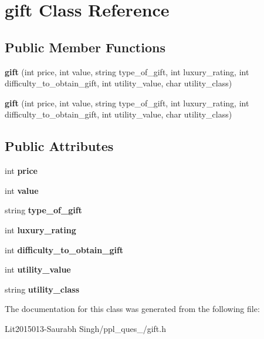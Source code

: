 \hypertarget{classgift}{}\section{gift Class Reference}
\label{classgift}
\subsection*{Public Member Functions}
\begin{DoxyCompactItemize}
\item 
\mbox{\label{classgift_a63b728ae46adca610d41cad4f66b8b24}} 
{\bfseries gift} (int price, int value, string type\+\_\+of\+\_\+gift, int luxury\+\_\+rating, int difficulty\+\_\+to\+\_\+obtain\+\_\+gift, int utility\+\_\+value, char utility\+\_\+class)
\item 
\mbox{\label{classgift_a63b728ae46adca610d41cad4f66b8b24}} 
{\bfseries gift} (int price, int value, string type\+\_\+of\+\_\+gift, int luxury\+\_\+rating, int difficulty\+\_\+to\+\_\+obtain\+\_\+gift, int utility\+\_\+value, char utility\+\_\+class)
\end{DoxyCompactItemize}
\subsection*{Public Attributes}
\begin{DoxyCompactItemize}
\item 
\mbox{\label{classgift_a0b47f2fdc5eb88daa269cc827324c931}} 
int {\bfseries price}
\item 
\mbox{\label{classgift_aa9e6fcf5bc68d7f151e7a853a25dcbeb}} 
int {\bfseries value}
\item 
\mbox{\label{classgift_a3feab4934d66fb383fe269fef66112ec}} 
string {\bfseries type\+\_\+of\+\_\+gift}
\item 
\mbox{\label{classgift_aa0bfbb583b69e093e31558a1565cad9a}} 
int {\bfseries luxury\+\_\+rating}
\item 
\mbox{\label{classgift_af1320e49b31139686edbcd0b7c262c00}} 
int {\bfseries difficulty\+\_\+to\+\_\+obtain\+\_\+gift}
\item 
\mbox{\label{classgift_a4b2ef48d28d424249c482ed19832b92c}} 
int {\bfseries utility\+\_\+value}
\item 
\mbox{\label{classgift_a768493e393b6e4f89e3653b4229d8b6a}} 
string {\bfseries utility\+\_\+class}
\end{DoxyCompactItemize}


The documentation for this class was generated from the following file\+:\begin{DoxyCompactItemize}
\item 
Lit2015013-\/\+Saurabh Singh/ppl\+\_\+ques\+\_/gift.\+h\end{DoxyCompactItemize}
